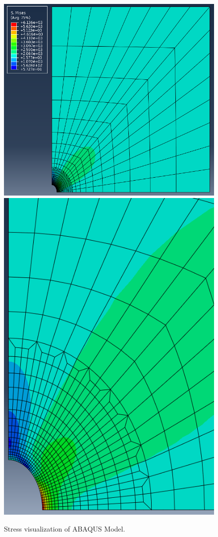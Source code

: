 \documentclass[12pt]{article}
\begin{document}
\begin{figure}[H]
	\begin{center}
		\includegraphics[scale=0.4]{ABAQUS_result_stress.png} 
		\includegraphics[scale=0.35]{ABAQUS_result_stress_crp.png} 
	\end{center}  
    \caption{Stress visualization of ABAQUS Model.}
\end{figure}
\end{document}

